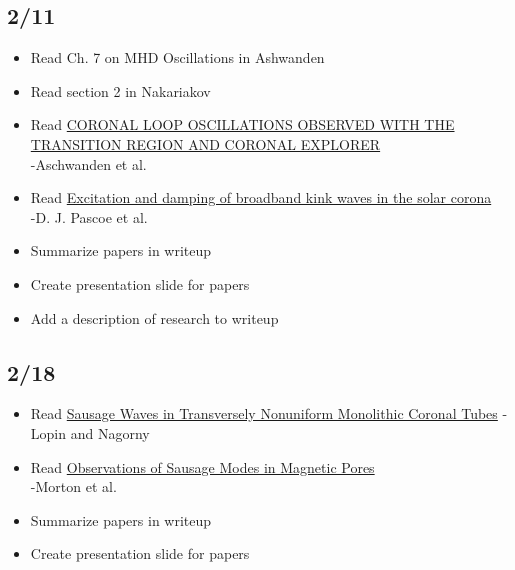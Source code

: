 \documentclass[12pt]{article}
\begin{document}
\subsection*{2/11}
\begin{itemize}
    \item Read Ch. 7 on MHD Oscillations in Ashwanden
    \item Read section 2 in Nakariakov
    \item Read
        \href{http://adsabs.harvard.edu/abs/1999ApJ...520..880A}
        {\textcolor{cobalt}{CORONAL LOOP OSCILLATIONS OBSERVED WITH THE TRANSITION
        REGION AND CORONAL EXPLORER}}\\
        -Aschwanden et al.
    \item Read
        \href{http://cdsads.u-strasbg.fr/abs/2015A\%26A...578A..99P}
        {\textcolor{cobalt}{Excitation and damping of broadband
        kink waves in the solar corona}}\\
        -D. J. Pascoe et al.
    \item Summarize papers in writeup
    \item Create presentation slide for papers
    \item Add a description of research to writeup
\end{itemize}

\subsection*{2/18}
\begin{itemize}
    \item Read
        \href{http://adsabs.harvard.edu/abs/2015ApJ...810...87L}
        {\textcolor{cobalt}{Sausage Waves in Transversely Nonuniform Monolithic Coronal
        Tubes}} -Lopin and Nagorny
    \item Read
        \href{http://cdsads.u-strasbg.fr/abs/2011ApJ...729L..18M}
        {\textcolor{cobalt}{Observations of Sausage Modes in Magnetic Pores}}\\
        -Morton et al.
    \item Summarize papers in writeup
    \item Create presentation slide for papers
\end{itemize}
\end{document}
